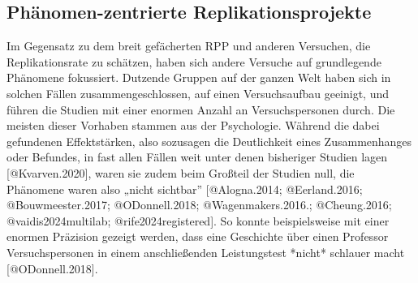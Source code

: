 \documentclass[
  letterpaper,
  DIV=11,
  numbers=noendperiod]{scrreprt}
\newenvironment{Shaded}{\begin{snugshade}}{\end{snugshade}}
\newcommand{\NormalTok}[1]{\textcolor[rgb]{0.00,0.23,0.31}{#1}}
\begin{document}
\begin{Shaded}
\end{Shaded}

\subsection{Phänomen-zentrierte
Replikationsprojekte}\label{phuxe4nomen-zentrierte-replikationsprojekte}

Im Gegensatz zu dem breit gefächerten RPP und anderen Versuchen, die
Replikationsrate zu schätzen, haben sich andere Versuche auf
grundlegende Phänomene fokussiert. Dutzende Gruppen auf der ganzen Welt
haben sich in solchen Fällen zusammengeschlossen, auf einen
Versuchsaufbau geeinigt, und führen die Studien mit einer enormen Anzahl
an Versuchspersonen durch. Die meisten dieser Vorhaben stammen aus der
Psychologie. Während die dabei gefundenen Effektstärken, also sozusagen
die Deutlichkeit eines Zusammenhanges oder Befundes, in fast allen
Fällen weit unter denen bisheriger Studien lagen {[}@Kvarven.2020{]},
waren sie zudem beim Großteil der Studien null, die Phänomene waren also
„nicht sichtbar'' {[}@Alogna.2014; @Eerland.2016; @Bouwmeester.2017;
@ODonnell.2018; @Wagenmakers.2016.; @Cheung.2016; @vaidis2024multilab;
@rife2024registered{]}. So konnte beispielsweise mit einer enormen
Präzision gezeigt werden, dass eine Geschichte über einen Professor
Versuchspersonen in einem anschließenden Leistungstest *nicht* schlauer
macht {[}@ODonnell.2018{]}.
\end{document}
